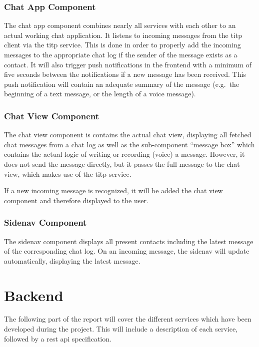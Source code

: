 \subsubsection{Chat App Component}
The chat app component combines nearly all services with each other to an actual working chat application.
It listens to incoming messages from the \ac{titp} client via the \ac{titp} service.
This is done in order to properly add the incoming messages to the appropriate chat log if the sender of the message
exists as a contact.
It will also trigger push notifications in the frontend with a minimum of five seconds between the notifications if a
new message has been received.
This push notification will contain an adequate summary of the message (e.g.\ the beginning of a text message, or the
length of a voice message).

\subsubsection{Chat View Component}
The chat view component is contains the actual chat view, displaying all fetched chat messages from a chat log as well
as the sub-component \enquote{message box} which contains the actual logic of writing or recording (voice) a message.
However, it does not send the message directly, but it passes the full message to the chat view, which makes use of the
\ac{titp} service.

If a new incoming message is recognized, it will be added the chat view component and therefore displayed to the user.

\subsubsection{Sidenav Component}
The sidenav component displays all present contacts including the latest message of the corresponding chat log.
On an incoming message, the sidenav will update automatically, displaying the latest message.



\section{Backend}\label{sec:backend}

The following part of the report will cover the different services which have been developed during the project.
This will include a description of each service, followed by a \ac{rest} \ac{api} specification.

